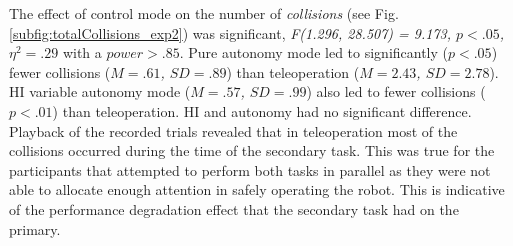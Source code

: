 \documentclass[a4paper,12pt,oneside,openright]{bhamthesis}
\begin{document}
The effect of control mode on the number of \textit{collisions} (see Fig. \ref{subfig:totalCollisions_exp2}) was significant, \textit{F(1.296, 28.507) = 9.173, $p < .05$, $\eta^2 = .29$} with a \textit{$power > .85$}. Pure autonomy mode led to significantly (\textit{$p < .05$}) fewer collisions (\textit{$M = .61$, $SD = .89$}) than teleoperation (\textit{$M = 2.43$, $SD = 2.78$}). HI variable autonomy mode (\textit{$M = .57$, $SD = .99$}) also led to fewer collisions (\textit{$p < .01$}) than teleoperation. HI and autonomy had no significant difference. Playback of the recorded trials revealed that in teleoperation most of the collisions occurred during the time of the secondary task. This was true for the participants that attempted to perform both tasks in parallel as they were not able to allocate enough attention in safely operating the robot. This is indicative of the performance degradation effect that the secondary task had on the primary.
\end{document}
